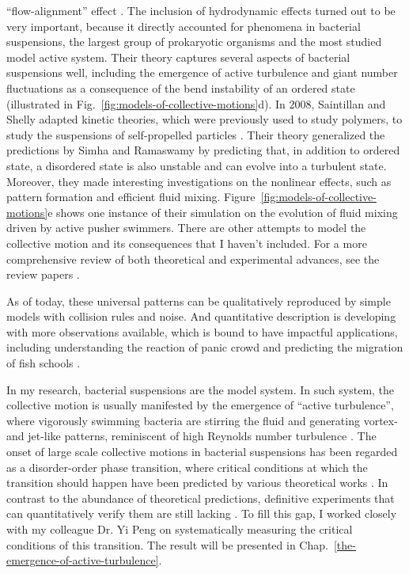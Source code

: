 ``flow-alignment'' effect \cite{Forster1974}. The inclusion of hydrodynamic effects turned out to be very important, because it directly accounted for phenomena in bacterial suspensions, the largest group of prokaryotic organisms and the most studied model active system. Their theory captures several aspects of bacterial suspensions well, including the emergence of active turbulence and giant number fluctuations as a consequence of the bend instability of an ordered state (illustrated in Fig.~\ref{fig:models-of-collective-motions}d). In 2008, Saintillan and Shelly adapted kinetic theories, which were previously used to study polymers, to study the suspensions of self-propelled particles \cite{Saintillan2008a, Saintillan2008b}. Their theory generalized the predictions by Simha and Ramaswamy by predicting that, in addition to ordered state, a disordered state is also unstable and can evolve into a turbulent state. Moreover, they made interesting investigations on the nonlinear effects, such as pattern formation and efficient fluid mixing. Figure~\ref{fig:models-of-collective-motions}e shows one instance of their simulation on the evolution of fluid mixing driven by active pusher swimmers. There are other attempts to model the collective motion and its consequences that I haven't included. For a more comprehensive review of both theoretical and experimental advances, see the review papers
\cite{Ramaswamy2010, Koch2011, Marchetti2013}.

As of today, these universal patterns can be qualitatively reproduced by simple models with collision rules and noise. And quantitative description is developing with more observations available, which is bound to have impactful applications, including understanding the reaction of panic crowd and predicting the migration of fish schools
\cite{Vicsek2012}.

In my research, bacterial suspensions are the model system. In such system, the collective motion is usually manifested by the emergence of ``active turbulence'', where vigorously swimming bacteria are stirring the fluid and generating vortex- and jet-like patterns, reminiscent of high Reynolds number turbulence \cite{Dombrowski2004, Sokolov2007, Sokolov2009,
Sokolov2012, Ishikawa2011, Wensink2012, Dunkel2013a, Peng2020}.
The onset of large scale collective motions in bacterial suspensions has been regarded as a disorder-order phase transition, where critical conditions at which the transition should happen have been predicted by various theoretical works \cite{Baskaran2009, Koch2011, Marchetti2013, Saintillan2015}.
In contrast to the abundance of theoretical predictions, definitive experiments that can quantitatively verify them are  still lacking \cite{Koch2011, Saintillan2015}.
To fill this gap, I worked closely with my colleague Dr. Yi Peng on systematically measuring the critical conditions of this transition. The result will be presented in Chap.~\ref{the-emergence-of-active-turbulence}.

